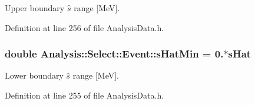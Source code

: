 Upper boundary $ \hat{s} $ range \mbox{[}MeV\mbox{]}. 



Definition at line 256 of file Analysis\+Data.\+h.

\subsubsection[{\texorpdfstring{s\+Hat\+Min}{sHatMin}}]{\setlength{\rightskip}{0pt plus 5cm}double Analysis\+::\+Select\+::\+Event\+::s\+Hat\+Min = 0.$\ast${\bf s\+Hat}\hspace{0.3cm}{\ttfamily [static]}}\hypertarget{namespaceAnalysis_1_1Select_1_1Event_afc8b09ec51a480d59ceb969a6e984788}{}\label{namespaceAnalysis_1_1Select_1_1Event_afc8b09ec51a480d59ceb969a6e984788}


Lower boundary $ \hat{s} $ range \mbox{[}MeV\mbox{]}. 



Definition at line 255 of file Analysis\+Data.\+h.

